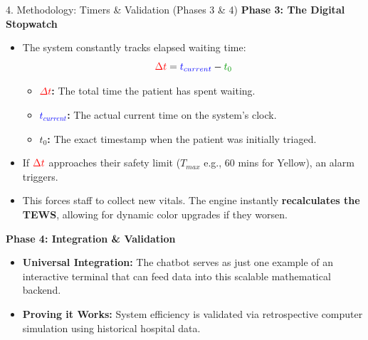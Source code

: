 \documentclass[11pt, aspectratio=169]{beamer}
\begin{document}
	\begin{frame}{4. Methodology: Timers \& Validation (Phases 3 \& 4)}
		\textbf{Phase 3: The Digital Stopwatch}
		\begin{itemize}
			\item The system constantly tracks elapsed waiting time: 
			\[
			\textcolor{red}{\Delta t} = \textcolor{blue}{t_{current}} - \textcolor{green!60!black}{t_0}
			\]
			\begin{itemize}
				\item \textbf{\textcolor{red}{$\Delta t$}:} The total time the patient has spent waiting.
				\item \textbf{\textcolor{blue}{$t_{current}$}:} The actual current time on the system's clock.
				\item \textbf{\textcolor{green!60!black}{$t_0$}:} The exact timestamp when the patient was initially triaged.
			\end{itemize}
			\item If $\textcolor{red}{\Delta t}$ approaches their safety limit ($T_{max}$ e.g., 60 mins for Yellow), an alarm triggers.
			\item This forces staff to collect new vitals. The engine instantly \textbf{recalculates the TEWS}, allowing for dynamic color upgrades if they worsen.
		\end{itemize}
		\vspace{0.1cm}
		\textbf{Phase 4: Integration \& Validation}
		\begin{itemize}
			\item \textbf{Universal Integration:} The chatbot serves as just one example of an interactive terminal that can feed data into this scalable mathematical backend.
			\item \textbf{Proving it Works:} System efficiency is validated via retrospective computer simulation using historical hospital data.
		\end{itemize}
	\end{frame}
	
\end{document}
